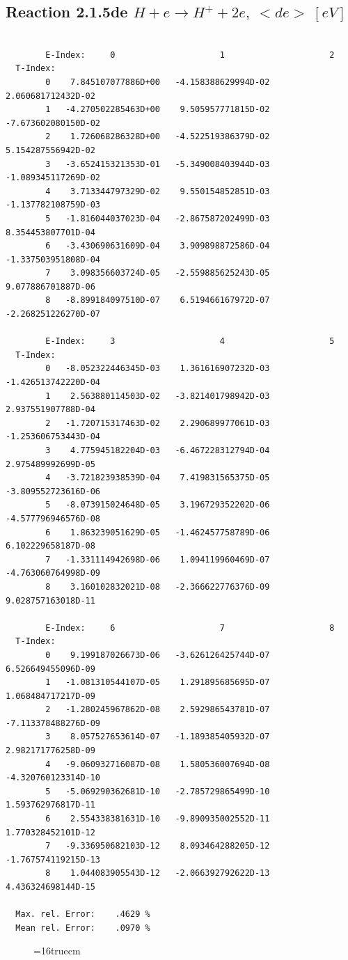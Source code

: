 \documentclass[12pt,dvips]{article}
\begin{document}
\newpage

\subsection{
Reaction 2.1.5de  $ H + e \rightarrow H^+ + 2e, \   <de> \ [eV]$}


\begin{small}\begin{verbatim}

        E-Index:     0                     1                     2
  T-Index:
        0    7.845107077886D+00   -4.158388629994D-02    2.060681712432D-02
        1   -4.270502285463D+00    9.505957771815D-02   -7.673602080150D-02
        2    1.726068286328D+00   -4.522519386379D-02    5.154287556942D-02
        3   -3.652415321353D-01   -5.349008403944D-03   -1.089345117269D-02
        4    3.713344797329D-02    9.550154852851D-03   -1.137782108759D-03
        5   -1.816044037023D-04   -2.867587202499D-03    8.354453807701D-04
        6   -3.430690631609D-04    3.909898872586D-04   -1.337503951808D-04
        7    3.098356603724D-05   -2.559885625243D-05    9.077886701887D-06
        8   -8.899184097510D-07    6.519466167972D-07   -2.268251226270D-07

        E-Index:     3                     4                     5
  T-Index:
        0   -8.052322446345D-03    1.361616907232D-03   -1.426513742220D-04
        1    2.563880114503D-02   -3.821401798942D-03    2.937551907788D-04
        2   -1.720715317463D-02    2.290689977061D-03   -1.253606753443D-04
        3    4.775945182204D-03   -6.467228312794D-04    2.975489992699D-05
        4   -3.721823938539D-04    7.419831565375D-05   -3.809552723616D-06
        5   -8.073915024648D-05    3.196729352202D-06   -4.577796946576D-08
        6    1.863239051629D-05   -1.462457758789D-06    6.102229658187D-08
        7   -1.331114942698D-06    1.094119960469D-07   -4.763060764998D-09
        8    3.160102832021D-08   -2.366622776376D-09    9.028757163018D-11

        E-Index:     6                     7                     8
  T-Index:
        0    9.199187026673D-06   -3.626126425744D-07    6.526649455096D-09
        1   -1.081310544107D-05    1.291895685695D-07    1.068484717217D-09
        2   -1.280245967862D-08    2.592986543781D-07   -7.113378488276D-09
        3    8.057527653614D-07   -1.189385405932D-07    2.982171776258D-09
        4   -9.060932716087D-08    1.580536007694D-08   -4.320760123314D-10
        5   -5.069290362681D-10   -2.785729865499D-10    1.593762976817D-11
        6    2.554338381631D-10   -9.890935002552D-11    1.770328452101D-12
        7   -9.336950682103D-12    8.093464288205D-12   -1.767574119215D-13
        8    1.044083905543D-12   -2.066392792622D-13    4.436324698144D-15

  Max. rel. Error:    .4629 %
  Mean rel. Error:    .0970 %

\end{verbatim}\end{small}
\begin{figure} \label{2.1.5li2}
\epsfxsize=16truecm
\end{figure}
\newpage
\end{document}
